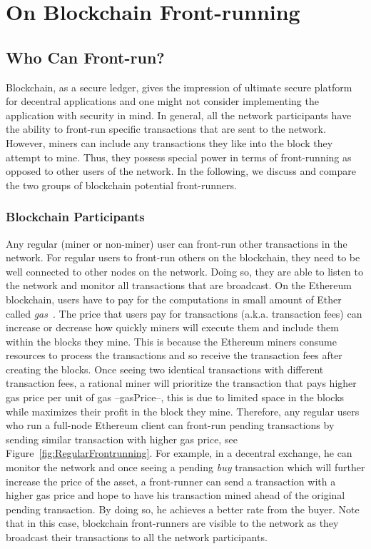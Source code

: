 



\section{On Blockchain Front-running}

\subsection{Who Can Front-run?}
\label{sec:who can front-run?}

Blockchain, as a secure ledger, gives the impression of ultimate secure platform for decentral applications and one might not consider implementing the application with security in mind. In general, all the network participants have the ability to front-run specific transactions that are sent to the network. However, miners can include any transactions they like into the block they attempt to mine. Thus, they possess special power in terms of front-running as opposed to other users of the network. In the following, we discuss and compare the two groups of blockchain potential front-runners.

\subsubsection{Blockchain Participants}
Any regular (miner or non-miner) user can front-run other transactions in the network. For regular users to front-run others on the blockchain, they need to be well connected to other nodes on the network. Doing so, they are able to listen to the network and monitor all transactions that are broadcast. On the Ethereum blockchain, users have to pay for the computations in small amount of Ether called \textit{gas}~\cite{AccountT67:online}. The price that users pay for transactions (a.k.a. transaction fees) can increase or decrease how quickly miners will execute them and include them within the blocks they mine. This is because the Ethereum miners consume resources to process the transactions and so receive the transaction fees after creating the blocks. Once seeing two identical transactions with different transaction fees,  a rational miner will prioritize the transaction that pays higher gas price per unit of gas --gasPrice--, this is due to limited space in the blocks while maximizes their profit in the block they mine. Therefore, any regular users who run a full-node Ethereum client can front-run pending transactions by sending similar transaction with higher gas price, see Figure~\ref{fig:RegularFrontrunning}. For example, in a decentral exchange, he can monitor the network and once seeing a pending \textit{buy} transaction which will further increase the price of the asset, a front-runner can send a transaction with a higher gas price and hope to have his transaction mined ahead of the original pending transaction. By doing so, he achieves a better rate from the buyer. Note that in this case, blockchain front-runners are visible to the network as they broadcast their transactions to all the network participants.  

